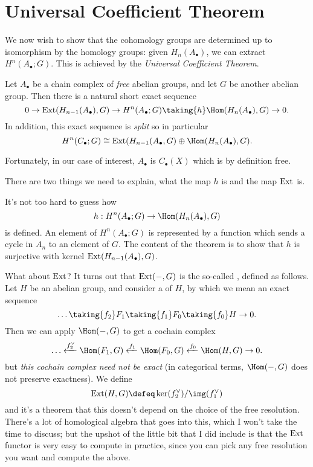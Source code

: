 \documentclass[11pt]{scrreprt}
\begin{document}
\section{Universal Coefficient Theorem}
We now wish to show that the cohomology groups are determined up to isomorphism
by the homology groups: given $H_n(A_\bullet)$, we can extract $H^n(A_\bullet; G)$.
This is achieved by the \emph{Universal Coefficient Theorem}.
\begin{theorem}
	Let $A_\bullet$ be a chain complex of \emph{free} abelian groups,
	and let $G$ be another abelian group.
	Then there is a natural short exact sequence
	\[
		0 \to \Ext(H_{n-1}(A_\bullet), G) \to H^n(A_\bullet; G)
		\taking{h} \Hom(H_n(A_\bullet), G) \to 0. \]
	In addition, this exact sequence is \emph{split}
	so in particular
	\[ H^n(C_\bullet; G) \cong \Ext(H_{n-1}(A_\bullet, G)
		\oplus \Hom(H_n(A_\bullet), G). \]
\end{theorem}
Fortunately, in our case of interest, $A_\bullet$ is $C_\bullet(X)$
which is by definition free.

There are two things we need to explain, what the map $h$ is and the map $\operatorname{Ext}$ is.

It's not too hard to guess how \[ h : H^n(A_\bullet; G) \to \Hom(H_n(A_\bullet), G) \] is defined.
An element of $H^n(A_\bullet;G)$ is represented by a function which sends a cycle
in $A_n$ to an element of $G$.
The content of the theorem is to show that $h$ is surjective with kernel $\operatorname{Ext}(H_{n-1}(A_\bullet), G)$.

What about $\operatorname{Ext}$?
It turns out that $\operatorname{Ext}(-,G)$ is the so-called , defined as follows.
Let $H$ be an abelian group, and consider a  of $H$,
by which we mean an exact sequence
\[ \dots \taking{f_2} F_1 \taking{f_1} F_0 \taking{f_0} H \to 0. \]
Then we can apply $\Hom(-,G)$ to get a cochain complex
\[ \dots \xleftarrow{f_2^\vee} \Hom(F_1, G) \xleftarrow{f_1}
	\Hom(F_0, G) \xleftarrow{f_0} \Hom(H,G) \to 0. \]
but \emph{this cochain complex need not be exact}
(in categorical terms, $\Hom(-,G)$ does not preserve exactness).
We define \[ \Ext(H,G) \defeq \ker(f_2^\vee) / \img(f_1^\vee) \]
and it's a theorem that this doesn't depend on the choice of the free resolution.
There's a lot of homological algebra that goes into this,
which I won't take the time to discuss;
but the upshot of the little bit that I did include is that the $\operatorname{Ext}$
functor is very easy to compute in practice, since
you can pick any free resolution you want and compute the above.
\end{document}
